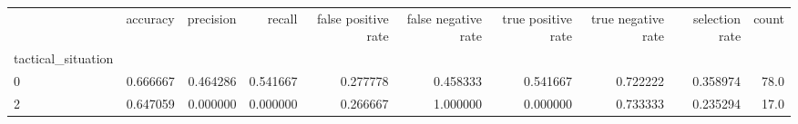 \begin{tabular}{lrrrrrrrrr}
\toprule
{} &  accuracy &  precision &    recall &  false positive rate &  false negative rate &  true positive rate &  true negative rate &  selection rate &  count \\
tactical\_situation &           &            &           &                      &                      &                     &                     &                 &        \\
\midrule
0                  &  0.666667 &   0.464286 &  0.541667 &             0.277778 &             0.458333 &            0.541667 &            0.722222 &        0.358974 &   78.0 \\
2                  &  0.647059 &   0.000000 &  0.000000 &             0.266667 &             1.000000 &            0.000000 &            0.733333 &        0.235294 &   17.0 \\
\bottomrule
\end{tabular}
